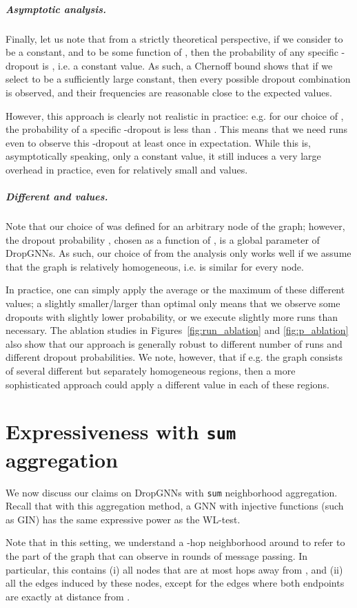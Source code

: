 \documentclass{article}
\begin{document}
\subparagraph*{Asymptotic analysis.} Finally, let us note that from a strictly theoretical perspective, if we consider  to be a constant, and  to be some function of , then the probability of any specific -dropout is , i.e. a constant value. As such, a Chernoff bound shows that if we select  to be a sufficiently large constant, then every possible dropout combination is observed, and their frequencies are reasonable close to the expected values.

However, this approach is clearly not realistic in practice: e.g. for our choice of , the probability of a specific -dropout is less than . This means that we need  runs even to observe this -dropout at least once in expectation. While this  is, asymptotically speaking, only a constant value, it still induces a very large overhead in practice, even for relatively small  and  values.

\subparagraph*{Different  and  values.} Note that our choice of  was defined for an arbitrary node of the graph; however, the dropout probability , chosen as a function of , is a global parameter of DropGNNs. As such, our choice of  from the analysis only works well if we assume that the graph is relatively homogeneous, i.e.  is similar for every node.

In practice, one can simply apply the average or the maximum of these different  values; a slightly smaller/larger than optimal  only means that we observe some dropouts with slightly lower probability, or we execute slightly more runs than necessary. The ablation studies in Figures~\ref{fig:run_ablation} and \ref{fig:p_ablation} also show that our approach is generally robust to different number of runs and different dropout probabilities. We note, however, that if e.g. the graph consists of several different but separately homogeneous regions, then a more sophisticated approach could apply a different  value in each of these regions.

\section{Expressiveness with \texttt{sum} aggregation} \label{app:express}

We now discuss our claims on DropGNNs with \texttt{sum} neighborhood aggregation. Recall that with this aggregation method, a GNN with injective functions (such as GIN) has the same expressive power as the WL-test.

Note that in this setting, we understand a -hop neighborhood around  to refer to the part of the graph that  can observe in  rounds of message passing. In particular, this contains (i) all nodes that are at most  hops away from , and (ii) all the edges induced by these nodes, except for the edges where both endpoints are exactly at distance  from .
\end{document}
